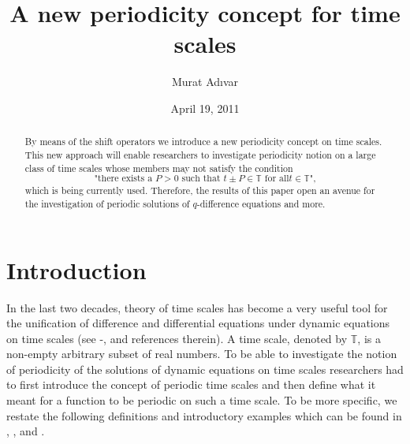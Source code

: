\documentclass[b5paper,reqno]{amsart}\usepackage{amsfonts}
\theoremstyle{plain}
\numberwithin{equation}{section}
\begin{document}
\title[Periodicity on time scales]{A new periodicity concept for time scales}
\author{Murat Ad\i var}

\address{\llap{*\,}Izmir University of Economics {\newline\indent}
                Department of Mathematics {\newline\indent}
                35330, Bal\c{c}ova{\newline\indent}
                Izmir, Turkey}
\date{April 19, 2011}

\begin{abstract}
By means of the shift operators we introduce a new periodicity concept on time
scales. This new approach will enable researchers to investigate periodicity
notion on a large class of time scales whose members may not satisfy the
condition\[
\text{"there exists a }P>0\text{ such that }t\pm P\in\mathbb{T}\text{ for all
}t\in\mathbb{T}\text{",}\]
which is being currently used. Therefore, the results of this paper open an
avenue for the investigation of periodic solutions of $q$-difference equations
and more.

\end{abstract}
\maketitle

\section{Introduction}

In the last two decades, theory of time scales has become a very useful tool
for the unification of difference and differential equations under dynamic
equations on time scales (see \cite{adivar}-\cite{Kaufmann&raffoul}, and
references therein). A time scale, denoted by $\mathbb{T}$, is a non-empty
arbitrary subset of real numbers. To be able to investigate the notion of
periodicity of the solutions of dynamic equations on time scales researchers
had to first introduce the concept of periodic time scales and then define
what it meant for a function to be periodic on such a time scale. To be more
specific, we restate the following definitions and introductory examples which
can be found in \cite{atici}, \cite{Bi&Bohner}, and \cite{Kaufmann&raffoul}.
\end{document}
